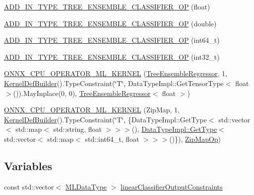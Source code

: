 \begin{DoxyCompactItemize}
\item 
\mbox{\hyperlink{namespaceonnxruntime_1_1ml_a5ca3fb69ea75368fc440ae6d314d7aae}{A\+D\+D\+\_\+\+I\+N\+\_\+\+T\+Y\+P\+E\+\_\+\+T\+R\+E\+E\+\_\+\+E\+N\+S\+E\+M\+B\+L\+E\+\_\+\+C\+L\+A\+S\+S\+I\+F\+I\+E\+R\+\_\+\+OP}} (float)
\item 
\mbox{\hyperlink{namespaceonnxruntime_1_1ml_adc25b4c0070b93ee2ba3b8b7767176ea}{A\+D\+D\+\_\+\+I\+N\+\_\+\+T\+Y\+P\+E\+\_\+\+T\+R\+E\+E\+\_\+\+E\+N\+S\+E\+M\+B\+L\+E\+\_\+\+C\+L\+A\+S\+S\+I\+F\+I\+E\+R\+\_\+\+OP}} (double)
\item 
\mbox{\hyperlink{namespaceonnxruntime_1_1ml_a0b4714f796c8f5d30ac5ee23c6b2b159}{A\+D\+D\+\_\+\+I\+N\+\_\+\+T\+Y\+P\+E\+\_\+\+T\+R\+E\+E\+\_\+\+E\+N\+S\+E\+M\+B\+L\+E\+\_\+\+C\+L\+A\+S\+S\+I\+F\+I\+E\+R\+\_\+\+OP}} (int64\+\_\+t)
\item 
\mbox{\hyperlink{namespaceonnxruntime_1_1ml_aba95ca1460a619772253de1c96635b95}{A\+D\+D\+\_\+\+I\+N\+\_\+\+T\+Y\+P\+E\+\_\+\+T\+R\+E\+E\+\_\+\+E\+N\+S\+E\+M\+B\+L\+E\+\_\+\+C\+L\+A\+S\+S\+I\+F\+I\+E\+R\+\_\+\+OP}} (int32\+\_\+t)
\item 
\mbox{\hyperlink{namespaceonnxruntime_1_1ml_a25bbe3b4ab4c03038335603f5184da48}{O\+N\+N\+X\+\_\+\+C\+P\+U\+\_\+\+O\+P\+E\+R\+A\+T\+O\+R\+\_\+\+M\+L\+\_\+\+K\+E\+R\+N\+EL}} (\mbox{\hyperlink{classonnxruntime_1_1ml_1_1TreeEnsembleRegressor}{Tree\+Ensemble\+Regressor}}, 1, \mbox{\hyperlink{classonnxruntime_1_1KernelDefBuilder}{Kernel\+Def\+Builder}}().Type\+Constraint(\char`\"{}T\char`\"{}, Data\+Type\+Impl\+::\+Get\+Tensor\+Type$<$ float $>$()).May\+Inplace(0, 0), \mbox{\hyperlink{classonnxruntime_1_1ml_1_1TreeEnsembleRegressor}{Tree\+Ensemble\+Regressor}}$<$ float $>$)
\item 
\mbox{\hyperlink{namespaceonnxruntime_1_1ml_ae3b5569105327291c8f8700462d69231}{O\+N\+N\+X\+\_\+\+C\+P\+U\+\_\+\+O\+P\+E\+R\+A\+T\+O\+R\+\_\+\+M\+L\+\_\+\+K\+E\+R\+N\+EL}} (Zip\+Map, 1, \mbox{\hyperlink{classonnxruntime_1_1KernelDefBuilder}{Kernel\+Def\+Builder}}().Type\+Constraint(\char`\"{}T\char`\"{}, \{Data\+Type\+Impl\+::\+Get\+Type$<$ std\+::vector$<$ std\+::map$<$ std\+::string, float $>$$>$$>$(), \mbox{\hyperlink{classonnxruntime_1_1DataTypeImpl_a4a10af95a06b1d04aba64fd7e8c2a8d6}{Data\+Type\+Impl\+::\+Get\+Type}}$<$ std\+::vector$<$ std\+::map$<$ std\+::int64\+\_\+t, float $>$$>$$>$()\}), \mbox{\hyperlink{classonnxruntime_1_1ml_1_1ZipMapOp}{Zip\+Map\+Op}})
\end{DoxyCompactItemize}
\subsection*{Variables}
\begin{DoxyCompactItemize}
\item 
const std\+::vector$<$ \mbox{\hyperlink{namespaceonnxruntime_ad77d0a6e838ec7da5dc35fed5ee66b49}{M\+L\+Data\+Type}} $>$ \mbox{\hyperlink{namespaceonnxruntime_1_1ml_a4a7bd52cc55c126e0155a8003044f065}{linear\+Classifier\+Output\+Constraints}}
\end{DoxyCompactItemize}


